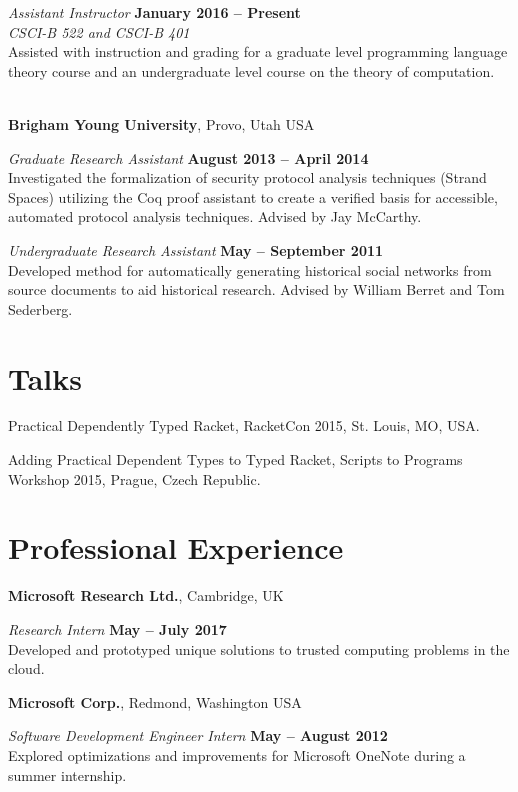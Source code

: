 \documentclass[margin,line]{res}
\begin{document}
\begin{resume}
{\em Assistant Instructor} \hfill {\bf January 2016 -- Present}\\ {\em
  CSCI-B 522 and CSCI-B 401}\\ Assisted with instruction and grading for a
graduate level programming language theory course and an undergraduate
level course on the theory of computation.

\hfill \\

{\bf Brigham Young University}, Provo, Utah USA

\vspace{-.3cm}

{\em Graduate Research Assistant} \hfill {\bf August 2013 -- April
  2014}\\ Investigated the formalization of security protocol analysis
techniques (Strand Spaces) utilizing the Coq proof assistant to create
a verified basis for accessible, automated protocol analysis
techniques. Advised by Jay McCarthy.

{\em Undergraduate Research Assistant} \hfill {\bf May -- September
  2011}\\ Developed method for automatically generating historical
social networks from source documents to aid historical
research. Advised by William Berret and Tom Sederberg.

\section{\sc Talks}
Practical Dependently Typed Racket, RacketCon 2015, St. Louis, MO, USA.

Adding Practical Dependent Types to Typed Racket, Scripts to Programs Workshop 2015, Prague, Czech Republic.

\section{\sc Professional Experience}
{\bf Microsoft Research Ltd.}, Cambridge, UK

\vspace{-.3cm}
{\em Research Intern} \hfill {\bf May -- July 2017}\\
Developed and prototyped unique solutions to trusted computing problems in the cloud.


{\bf Microsoft Corp.}, Redmond, Washington USA

\vspace{-.3cm}
{\em Software Development Engineer Intern} \hfill {\bf May -- August 2012}\\
Explored optimizations and improvements for Microsoft OneNote during a
summer internship.


\end{resume}
\end{document}
